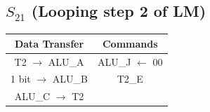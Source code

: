 \documentclass[]{report}
\begin{document}
            \subsection*{$S_{21}$ (Looping step 2 of LM)} %
            \begin{center}
                \begin{tabular}{|c|c|}
                    \hline
                    Data Transfer & Commands \\
                    \hline
                    T2 $\to$ ALU\_A & ALU\_J $\leftarrow$ 00\\
                    1 bit $\to$ ALU\_B & T2\_E\\        %
                    ALU\_C $\to$ T2 & \\
                    \hline
                \end{tabular}
            \end{center} 
\end{document}
